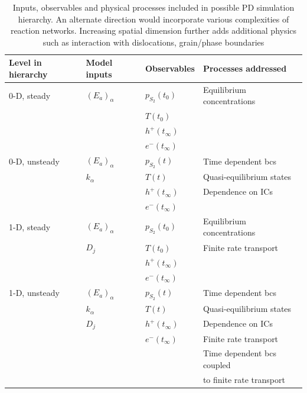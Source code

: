 \documentclass[11pt]{article}
\begin{document}
\begin{table}[h]
  \centering
  \begin{tabular}{l l l l}
    Level in hierarchy & Model inputs & Observables & Processes
    addressed \\
    \hline
    0-D, steady & $(E_a)_\alpha$  & $p_{S_2}(t_0)$ & Equilibrium
    concentrations \\
    & & $T(t_0)$ & \\
    & & $h^+(t_\infty)$ & \\
    & & $e^-(t_\infty)$ & \\
    \hline
    0-D, unsteady & $(E_a)_\alpha$& $p_{S_2}(t)$ & Time dependent
    bcs \\
    & $k_\alpha$ & $T(t)$ & Quasi-equilibrium states \\
    & & $h^+(t_\infty)$ & Dependence on ICs \\
    & & $e^-(t_\infty)$ & \\

    \hline
    1-D, steady & $(E_a)_\alpha$ &  $p_{S_2}(t_0)$ & Equilibrium
    concentrations \\
     & $D_j$ & $T(t_0)$ & Finite rate transport \\
    & & $h^+(t_\infty)$ & \\
    & & $e^-(t_\infty)$ & \\
    \hline
    1-D, unsteady & $(E_a)_\alpha$& $p_{S_2}(t)$ & Time dependent
    bcs \\
    & $k_\alpha$ & $T(t)$ & Quasi-equilibrium states \\
     & $D_j$ &$h^+(t_\infty)$ &  Dependence on ICs \\
     & & $e^-(t_\infty)$ & Finite rate transport \\
     & && Time dependent bcs coupled \\
     & & &    to finite rate transport \\
  \end{tabular}
  \caption{Inputs, observables and physical processes included in
    possible PD simulation hierarchy. An alternate direction would
    incorporate various complexities of reaction networks. Increasing spatial dimension
    further adds additional physics such as interaction with dislocations, grain/phase boundaries}
  \label{tab:pdh}
\end{table}




 
\end{document}
